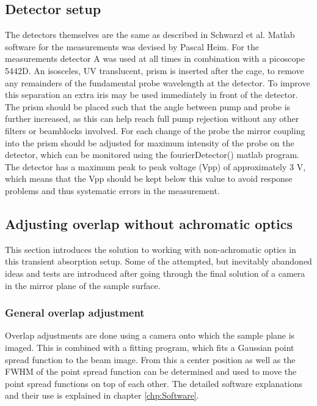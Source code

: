 \documentclass[twoside,openright]{scrreprt}
\begin{document}
\subsection{Detector setup}
The detectors themselves are the same as described in Schwarzl et al.\cite{Schwarzl2022} Matlab software for the measurements was devised by Pascal Heim. For the measurements detector A was used at all times in combination with a picoscope 5442D. An isosceles, UV translucent, prism is inserted after the cage, to remove any remainders of the fundamental probe wavelength at the detector. To improve this separation an extra iris may be used immediately in front of the detector.\\
The prism should be placed such that the angle between pump and probe is further increased, as this can help reach full pump rejection without any other filters or beamblocks involved. For each change of the probe the mirror coupling into the prism should be adjusted for maximum intensity of the probe on the detector, which can be monitored using the fourierDetector() matlab program.\\
The detector has a maximum peak to peak voltage (Vpp) of approximately 3 V, which means that the Vpp should be kept below this value to avoid response problems and thus systematic errors in the measurement.
\subsection{Adjusting overlap without achromatic optics}
This section introduces the solution to working with non-achromatic optics in this transient absorption setup. Some of the attempted, but inevitably abandoned ideas and tests are introduced after going through the final solution of a camera in the mirror plane of the sample surface.
\subsubsection{General overlap adjustment}
Overlap adjustments are done using a camera onto which the sample plane is imaged. This is combined with a fitting program, which fits a Gaussian point spread function to the beam image. From this a center position as well as the FWHM of the point spread function can be determined and used to move the point spread functions on top of each other. The detailed software explanations and their use is explained in chapter \ref{chp:Software}.
\end{document}
